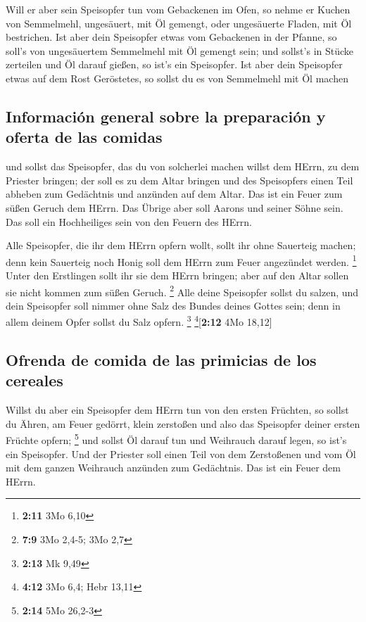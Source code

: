  Will er aber sein Speisopfer tun vom Gebackenen im Ofen,
so nehme er Kuchen von Semmelmehl, ungesäuert, mit Öl gemengt, oder
ungesäuerte Fladen, mit Öl bestrichen.  Ist aber dein
Speisopfer etwas vom Gebackenen in der Pfanne, so soll's von
ungesäuertem Semmelmehl mit Öl gemengt sein;  und sollst's
in Stücke zerteilen und Öl darauf gießen, so ist's ein Speisopfer.
 Ist aber dein Speisopfer etwas auf dem Rost Geröstetes,
so sollst du es von Semmelmehl mit Öl machen

\hypertarget{informaciuxf3n-general-sobre-la-preparaciuxf3n-y-oferta-de-las-comidas}{%
\subsection{Información general sobre la preparación y oferta de las
comidas}\label{informaciuxf3n-general-sobre-la-preparaciuxf3n-y-oferta-de-las-comidas}}

 und sollst das Speisopfer, das du von solcherlei machen
willst dem HErrn, zu dem Priester bringen; der soll es zu dem Altar
bringen  und des Speisopfers einen Teil abheben zum
Gedächtnis und anzünden auf dem Altar. Das ist ein Feuer zum süßen
Geruch dem HErrn.  Das Übrige aber soll Aarons und seiner
Söhne sein. Das soll ein Hochheiliges sein von den Feuern des HErrn.

 Alle Speisopfer, die ihr dem HErrn opfern wollt, sollt
ihr ohne Sauerteig machen; denn kein Sauerteig noch Honig soll dem HErrn
zum Feuer angezündet werden. \footnote{\textbf{2:11} 3Mo 6,10}
 Unter den Erstlingen sollt ihr sie dem HErrn bringen;
aber auf den Altar sollen sie nicht kommen zum süßen Geruch. \footnote{\textbf{7:9}
  3Mo 2,4-5; 3Mo 2,7}  Alle deine Speisopfer sollst du
salzen, und dein Speisopfer soll nimmer ohne Salz des Bundes deines
Gottes sein; denn in allem deinem Opfer sollst du Salz opfern.
\footnote{\textbf{2:13} Mk 9,49} \footnote{\textbf{4:12} 3Mo 6,4; Hebr
  13,11}{[}\textbf{2:12} 4Mo 18,12{]}

\hypertarget{ofrenda-de-comida-de-las-primicias-de-los-cereales}{%
\subsection{Ofrenda de comida de las primicias de los
cereales}\label{ofrenda-de-comida-de-las-primicias-de-los-cereales}}

 Willst du aber ein Speisopfer dem HErrn tun von den
ersten Früchten, so sollst du Ähren, am Feuer gedörrt, klein zerstoßen
und also das Speisopfer deiner ersten Früchte opfern; \footnote{\textbf{2:14}
  5Mo 26,2-3}  und sollst Öl darauf tun und Weihrauch
darauf legen, so ist's ein Speisopfer.  Und der Priester
soll einen Teil von dem Zerstoßenen und vom Öl mit dem ganzen Weihrauch
anzünden zum Gedächtnis. Das ist ein Feuer dem HErrn.

